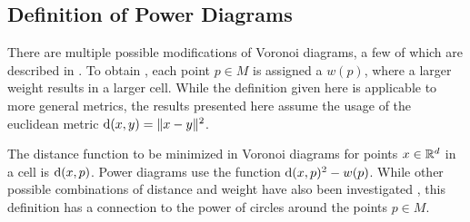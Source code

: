 \subsection{Definition of Power Diagrams}
\label{sub:definition_of_power_diagrams}
There are multiple possible modifications of Voronoi diagrams, a few of which are described in \cite{aurenhammer1987power}.
To obtain , each point $p \in M$ is assigned a  $w(p)$, where a larger weight results in a larger cell.
While the definition given here is applicable to more general metrics, the results presented here assume the usage of the euclidean metric $\operatorname{d}(x, y) = \Vert x - y \Vert^2$.

The distance function to be minimized in Voronoi diagrams for points $x \in \mathbb{R}^d$ in a cell is $\operatorname{d}(x, p)$.
Power diagrams use the function $\operatorname{d}(x, p)^2 - w(p)$.
While other possible combinations of distance and weight have also been investigated \cite{aurenhammer1987power}, this definition has a connection to the power of circles around the points $p \in M$.

